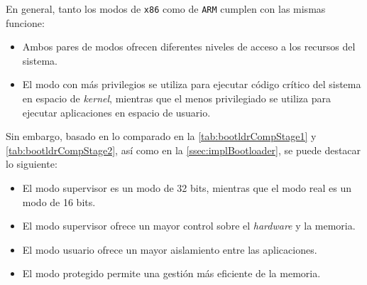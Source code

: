 	\newpage
	
	En general, tanto los modos de \texttt{x86} como de \texttt{ARM} cumplen con las mismas funcione:
	\begin{itemize} \setlength\itemsep{0pt}
		\item Ambos pares de modos ofrecen diferentes niveles de acceso a los recursos del sistema.
		\item El modo con más privilegios se utiliza para ejecutar código crítico del sistema en espacio de \textit{kernel}, mientras que el menos privilegiado se utiliza para ejecutar aplicaciones en espacio de usuario.
	\end{itemize}	

	
	
	Sin embargo, basado en lo comparado en la \autoref{tab:bootldrCompStage1} y \autoref{tab:bootldrCompStage2}, así como en la \autoref{ssec:implBootloader}, se puede destacar lo siguiente:
	\begin{itemize} \setlength\itemsep{0pt}
		\item El modo supervisor es un modo de 32 bits, mientras que el modo real es un modo de 16 bits.
		
		\item El modo supervisor ofrece un mayor control sobre el \textit{hardware} y la memoria.
		
		\item El modo usuario ofrece un mayor aislamiento entre las aplicaciones.
		
		\item El modo protegido permite una gestión más eficiente de la memoria.
	\end{itemize}

	\newpage
	
